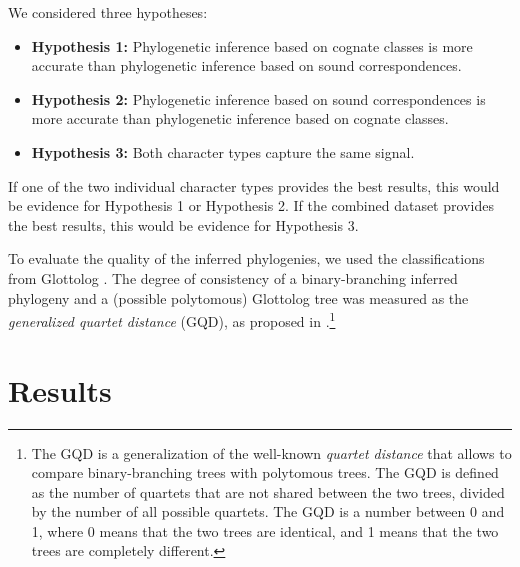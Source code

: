 \documentclass[10pt, a4paper]{article}
\begin{document}
We considered three hypotheses:

\begin{itemize}
  \item \textbf{Hypothesis 1:} Phylogenetic inference based on cognate classes is more accurate than phylogenetic inference based on sound correspondences.
  \item \textbf{Hypothesis 2:} Phylogenetic inference based on sound correspondences is more accurate than phylogenetic inference based on cognate classes.
  \item \textbf{Hypothesis 3:} Both character types capture the same signal.
\end{itemize}

If one of the two individual character types provides the best results, this would be evidence for Hypothesis 1 or Hypothesis 2. If the combined dataset provides the best results, this would be evidence for Hypothesis 3.


To evaluate the quality of the inferred phylogenies, we used the classifications from Glottolog \citep{Glottolog}. The degree of consistency of a binary-branching inferred phylogeny and a (possible polytomous) Glottolog tree was measured as the \emph{generalized quartet distance} (GQD), as proposed in \citep{pompei2011accuracy}.\footnote{The GQD is a generalization of the well-known \emph{quartet distance} \citep{estabrook1985comparison} that allows to compare binary-branching trees with polytomous trees. The GQD is defined as the number of quartets that are not shared between the two trees, divided by the number of all possible quartets. The GQD is a number between 0 and 1, where 0 means that the two trees are identical, and 1 means that the two trees are completely different.}

\section{Results}
\end{document}
